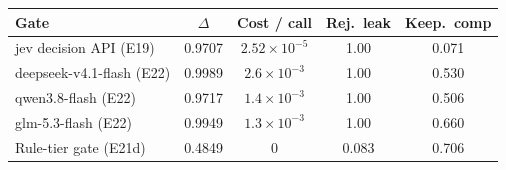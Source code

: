 \begin{tabular}{lcccc}
\toprule
Gate & $\Delta$ & Cost / call & Rej.\ leak & Keep.\ comp\\
\midrule
jev decision API (E19) & 0.9707 & $2.52\times10^{-5}$ & 1.00 & 0.071\\
deepseek-v4.1-flash (E22) & 0.9989 & $2.6\times10^{-3}$ & 1.00 & 0.530\\
qwen3.8-flash (E22) & 0.9717 & $1.4\times10^{-3}$ & 1.00 & 0.506\\
glm-5.3-flash (E22) & 0.9949 & $1.3\times10^{-3}$ & 1.00 & 0.660\\
Rule-tier gate (E21d) & 0.4849 & $0$ & 0.083 & 0.706\\
\bottomrule
\end{tabular}
